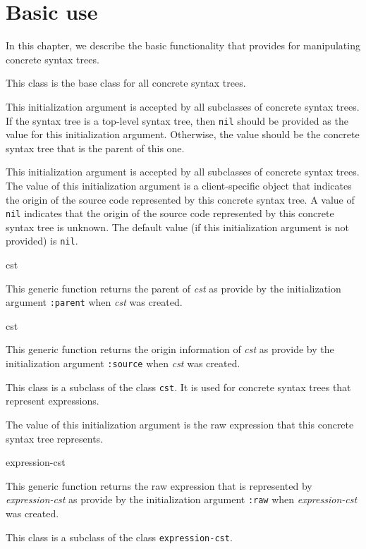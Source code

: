 \chapter{Basic use}

In this chapter, we describe the basic functionality that \sysname{}
provides for manipulating concrete syntax trees.


This class is the base class for all concrete syntax trees.


This initialization argument is accepted by all subclasses of concrete
syntax trees.  If the syntax tree is a top-level syntax tree, then
\texttt{nil} should be provided as the value for this initialization
argument.  Otherwise, the value should be the concrete syntax tree
that is the parent of this one.


This initialization argument is accepted by all subclasses of concrete
syntax trees.  The value of this initialization argument is a
client-specific object that indicates the origin of the source code
represented by this concrete syntax tree.  A value of \texttt{nil}
indicates that the origin of the source code represented by this concrete
syntax tree is unknown.  The default value (if this initialization
argument is not provided) is \texttt{nil}.

 {cst}

This generic function returns the parent of \textit{cst} as provide by
the initialization argument \texttt{:parent} when \textit{cst} was
created.

 {cst}

This generic function returns the origin information of \textit{cst}
as provide by the initialization argument \texttt{:source} when
\textit{cst} was created.


This class is a subclass of the class \texttt{cst}.  It is used for
concrete syntax trees that represent \commonlisp{} expressions.


The value of this initialization argument is the raw \commonlisp{}
expression that this concrete syntax tree represents.

 {expression-cst}

This generic function returns the raw \commonlisp{} expression that is
represented by \textit{expression-cst} as provide by the
initialization argument \texttt{:raw} when \textit{expression-cst} was
created.


This class is a subclass of the class \texttt{expression-cst}.
